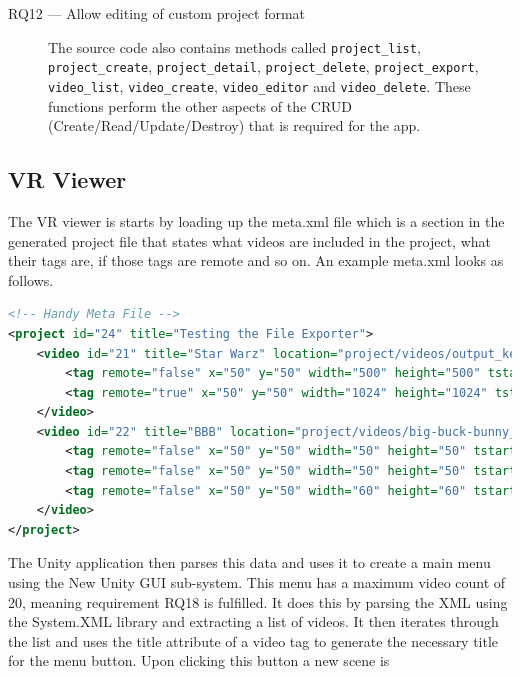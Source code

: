 \documentclass[12pt]{report}
\newcommand{\inlinecode}{\texttt}
\begin{document}
\begin{description}
    \item[RQ12 --- Allow editing of custom project format] The source code also
        contains methods called \inlinecode{project\_list},
        \inlinecode{project\_create}, \inlinecode{project\_detail},
        \inlinecode{project\_delete}, \inlinecode{project\_export},
        \inlinecode{video\_list}, \inlinecode{video\_create},
        \inlinecode{video\_editor} and \inlinecode{video\_delete}. These
        functions perform the other aspects of the CRUD
        (Create/Read/Update/Destroy) that is required for the app.
\end{description}

\subsection{VR Viewer}
The VR viewer is starts by loading up the meta.xml file which is a section in
the generated project file that states what videos are included in the project,
what their tags are, if those tags are remote and so on. An example meta.xml
looks as follows.
\begin{lstlisting}[language=XML, breaklines=true]
<!-- Handy Meta File -->
<project id="24" title="Testing the File Exporter">
    <video id="21" title="Star Warz" location="project/videos/output_ke4Kqgg.webm">
        <tag remote="false" x="50" y="50" width="500" height="500" tstart="55" tend="60" local_content="Dod Gamn Stormtroopers"/>
        <tag remote="true" x="50" y="50" width="1024" height="1024" tstart="62" tend="72" remote_url="www.google.com/?q=Darth"/>
    </video>
    <video id="22" title="BBB" location="project/videos/big-buck-bunny_trailer_9RD0r16.webm">
        <tag remote="false" x="50" y="50" width="50" height="50" tstart="5" tend="7" local_content="Tree"/>
        <tag remote="false" x="50" y="50" width="50" height="50" tstart="10" tend="11" local_content="Bunny"/>
        <tag remote="false" x="50" y="50" width="60" height="60" tstart="18" tend="23" local_content="You done goofed"/>
    </video>
</project>
\end{lstlisting}
The Unity application then parses this data and uses it to create a main menu
using the New Unity GUI sub-system. This menu has a maximum video count of 20,
meaning requirement RQ18 is fulfilled. It does this by parsing the XML using
the System.XML library and extracting a list of videos. It then iterates
through the list and uses the title attribute of a video tag to generate the
necessary title for the menu button. Upon clicking this button a new scene is
\end{document}
